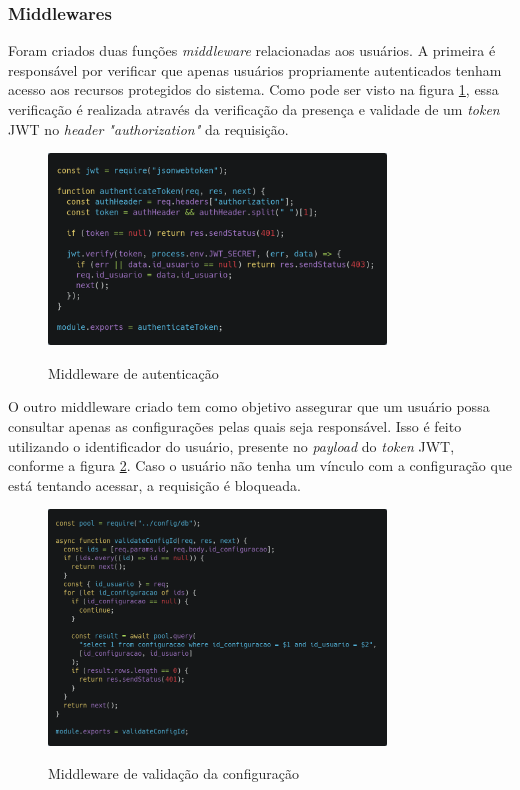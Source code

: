 \subsubsection{Middlewares}
Foram criados duas funções \textit{middleware} relacionadas aos usuários. A primeira é responsável por verificar que apenas usuários propriamente autenticados tenham acesso aos recursos protegidos do sistema. Como pode ser visto na figura \ref{fig:auth}, essa verificação é realizada através da verificação da presença e validade de um \textit{token} JWT no \textit{header "authorization"} da requisição.

\begin{figure}[!htb]
	\centering
	\caption{Middleware de autenticação}
	\includegraphics[width=0.8\textwidth]{./dados/figuras/authMiddleware}
	\label{fig:auth}
\end{figure}
\pagebreak

O outro middleware criado tem como objetivo assegurar que um usuário possa consultar apenas as configurações pelas quais seja responsável. Isso é feito utilizando o identificador do usuário, presente no \textit{payload} do \textit{token} JWT, conforme a figura \ref{fig:configMiddleware}. Caso o usuário não tenha um vínculo com a configuração que está tentando acessar, a requisição é bloqueada.

\begin{figure}[!htb]
	\centering
	\caption{Middleware de validação da configuração}
	\includegraphics[width=0.8\textwidth]{./dados/figuras/configMiddleware}
	\label{fig:configMiddleware}
\end{figure}
\pagebreak


